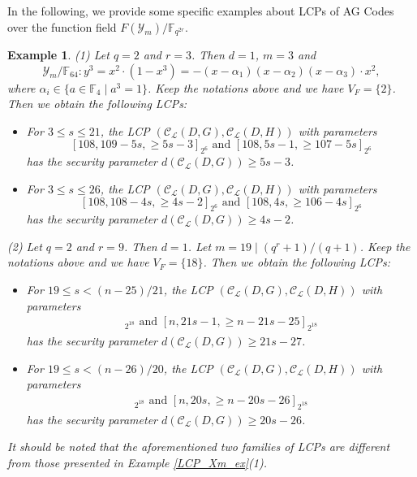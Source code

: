 \documentclass[journal,12pt,onecolumn]{IEEEtran}
\newtheorem{example}[theorem]{Example}
\begin{document}
In the following, we provide some specific examples about LCPs of AG Codes over the function field $F(\mathcal{Y}_m)/\mathbb{F}_{q^{2r}}$.

\begin{example}\label{LCP_Ym_ex}
    {\rm (1)} Let $q=2$ and $r=3$. Then $d=1$, $m=3$ and 
    \[
        \mathcal{Y}_m/\mathbb{F}_{64} : y^3 = x^2\cdot(1-x^3) = - (x-\alpha_1)(x-\alpha_2)(x-\alpha_3)\cdot x^2, 
    \]
    where $\alpha_i\in \{ a\in\mathbb{F}_{4}\mid a^{3} = 1 \}$. Keep the notations above and we have $V_F = \{2\}$. Then we obtain the following LCPs:
    \begin{itemize}
        \item For $3\le s \le21$, the LCP $(\mathcal{C}_{\mathcal{L}}(D,G),\mathcal{C}_{\mathcal{L}}(D,H))$ with parameters
        \[
            [108,109-5s,\ge 5s-3]_{2^6}\text{ and }[108,5s-1,\ge 107-5s]_{2^6}
        \]
        has the security parameter $d(\mathcal{C}_{\mathcal{L}}(D,G))\ge 5s-3$.
        \item For $3\le s \le 26$, the LCP $(\mathcal{C}_{\mathcal{L}}(D,G),\mathcal{C}_{\mathcal{L}}(D,H))$ with parameters
        \[
            [108,108-4s,\ge 4s-2]_{2^6}\text{ and }[108,4s,\ge 106-4s]_{2^6}
        \]
        has the security parameter $d(\mathcal{C}_{\mathcal{L}}(D,G))\ge 4s-2$.
    \end{itemize}

    {\rm (2)} Let $q = 2$ and $r = 9$. Then $d = 1$. Let $m = 19\mid (q^r+1)/(q+1)$. Keep the notations above and we have $V_F = \{18\}$. Then we obtain the following LCPs:
    \begin{itemize}
        \item For $19\le s <(n-25)/21$, the LCP $(\mathcal{C}_{\mathcal{L}}(D,G),\mathcal{C}_{\mathcal{L}}(D,H))$ with parameters
        \begin{gather*}
            [n,n-21s+1,\ge 21s-27]_{2^{18}}\text{ and }[n,21s-1,\ge n-21s-25]_{2^{18}}
        \end{gather*}
        has the security parameter $d(\mathcal{C}_{\mathcal{L}}(D,G))\ge 21s-27$.
        \item For $19\le s <(n-26)/20$, the LCP $(\mathcal{C}_{\mathcal{L}}(D,G),\mathcal{C}_{\mathcal{L}}(D,H))$ with parameters
        \begin{gather*}
            [n,n-20s,\ge 20s-26]_{2^{18}}\text{ and }[n,20s,\ge n-20s-26]_{2^{18}}
        \end{gather*}
        has the security parameter $d(\mathcal{C}_{\mathcal{L}}(D,G))\ge 20s-26$.
    \end{itemize}
    It should be noted that the aforementioned two families of LCPs are different from those presented in Example \ref{LCP_Xm_ex}(1). 
\end{example}
\end{document}
